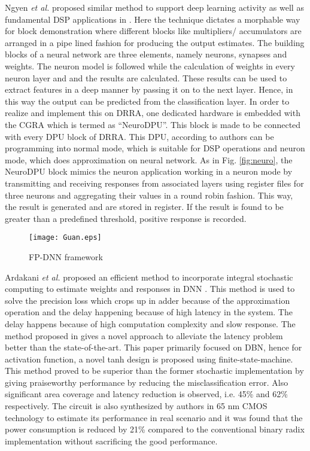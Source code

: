 \documentclass[journal]{IEEEtran}
\begin{document}
\par Ngyen \textit{et al.} proposed similar method to support deep learning activity as well as fundamental DSP applications in \cite{paper8}. Here the technique dictates a morphable way for block demonstration where different blocks like multipliers/ accumulators are arranged in a pipe lined fashion for producing the output estimates. 
The building blocks of a neural network are three elements, namely neurons, synapses and weights. The neuron model is followed while the calculation of weights in every neuron layer and and the results are calculated. These results can be used to extract features in a deep manner by passing it on to the next layer. Hence, in this way the output can be predicted from the classification layer. In order to realize and implement this on DRRA, one dedicated hardware is embedded with the CGRA which is termed as ``NeuroDPU''. This block is made to be connected with every DPU block of DRRA. This DPU, according to authors can be programming into normal mode, which is suitable for DSP operations and neuron mode, which does approximation on neural network. As in Fig. \ref{fig:neuro}, the NeuroDPU block mimics the neuron application working in a neuron mode by transmitting and receiving responses from associated layers using register files for three neurons and aggregating their values in a round robin fashion. This way, the result is generated and are stored in register. If the result is found to be greater than a predefined threshold, positive response is recorded.

\begin{figure}[b]
    \centering
    \texttt{[image: Guan.eps]}
    \caption{FP-DNN framework \cite{paper10}}
    \label{fig:guan}
\end{figure}
\par Ardakani \textit{et al.} proposed an efficient method to incorporate integral stochastic computing to estimate weights and responses in DNN \cite{paper9}. This method is used to solve the precision loss which crops up in adder because of the approximation operation and the delay happening because of high latency in the system. The delay happens because of high computation complexity and slow response. The method proposed in \cite{paper9} gives a novel approach to alleviate the latency problem better than the state-of-the-art. This paper primarily focused on DBN, hence for activation function, a novel tanh design is proposed using finite-state-machine. This method proved to be superior than the former stochastic implementation by giving praiseworthy performance by reducing the misclassification error. Also significant area coverage and latency reduction is observed, i.e. 45\% and 62\% respectively. The circuit is also synthesized by authors in 65 nm CMOS technology to estimate its performance in real scenario and it was found that the power consumption is reduced by 21\% compared to the conventional binary radix implementation without sacrificing the good performance.
\end{document}
